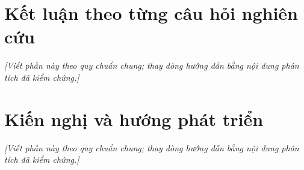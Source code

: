 \section{Kết luận theo từng câu hỏi nghiên cứu}
\noindent\textit{[Viết phần này theo quy chuẩn chung; thay dòng hướng dẫn bằng nội dung phân tích đã kiểm chứng.]}

\section{Kiến nghị và hướng phát triển}
\noindent\textit{[Viết phần này theo quy chuẩn chung; thay dòng hướng dẫn bằng nội dung phân tích đã kiểm chứng.]}

